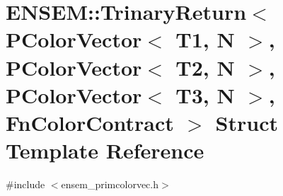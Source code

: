 \hypertarget{structENSEM_1_1TrinaryReturn_3_01PColorVector_3_01T1_00_01N_01_4_00_01PColorVector_3_01T2_00_01N4ce572db3e48fe7214a7d25b458894fc}{}\section{E\+N\+S\+EM\+:\+:Trinary\+Return$<$ P\+Color\+Vector$<$ T1, N $>$, P\+Color\+Vector$<$ T2, N $>$, P\+Color\+Vector$<$ T3, N $>$, Fn\+Color\+Contract $>$ Struct Template Reference}
\label{structENSEM_1_1TrinaryReturn_3_01PColorVector_3_01T1_00_01N_01_4_00_01PColorVector_3_01T2_00_01N4ce572db3e48fe7214a7d25b458894fc}


{\ttfamily \#include $<$ensem\+\_\+primcolorvec.\+h$>$}


